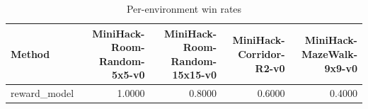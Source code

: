 \begin{table}[htbp]
\centering
\caption{Per-environment win rates}
\label{tab:per-env}
\begin{tabular}{lrrrr}
\toprule
\textbf{Method} & \textbf{MiniHack-Room-Random-5x5-v0} & \textbf{MiniHack-Room-Random-15x15-v0} & \textbf{MiniHack-Corridor-R2-v0} & \textbf{MiniHack-MazeWalk-9x9-v0} \\
\midrule
reward\_model & 1.0000 & 0.8000 & 0.6000 & 0.4000 \\
\bottomrule
\end{tabular}
\end{table}